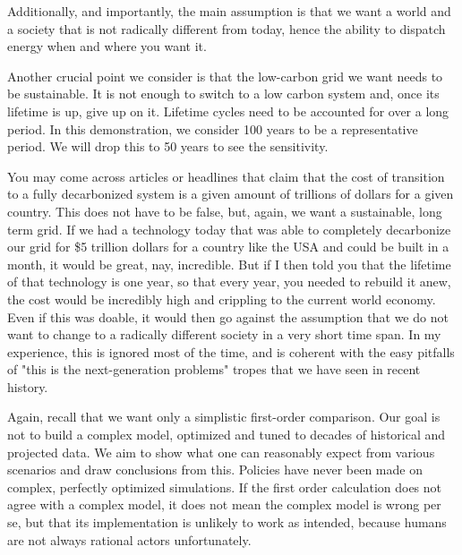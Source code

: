 Additionally, and importantly, the main assumption is that we want a world and a society that is not radically different from today, hence the ability to dispatch energy when and where you want it.

Another crucial point we consider is that the low-carbon grid we want needs to be sustainable. It is not enough to switch to a low carbon system and, once its lifetime is up, give up on it. Lifetime cycles need to be accounted for over a long period. In this demonstration, we consider 100 years to be a representative period. We will drop this to 50 years to see the sensitivity.

\begin{kaobox}[frametitle=The total transition cost is X Trillions\ldots]
You may come across articles or headlines that claim that the cost of transition to a fully decarbonized system is a given amount of trillions of dollars for a given country. This does not have to be false, but, again, we want a sustainable, long term grid. If we had a technology today that was able to completely decarbonize our grid for \$5 trillion dollars for a country like the USA and could be built in a month, it would be great, nay, incredible. But if I then told you that the lifetime of that technology is one year, so that every year, you needed to rebuild it anew, the cost would be incredibly high and crippling to the current world economy. Even if this was doable, it would then go against the assumption that we do not want to change to a radically different society in a very short time span. In my experience, this is ignored most of the time, and is coherent with the easy pitfalls of "this is the next-generation problems" tropes that we have seen in recent history.
\end{kaobox}



Again, recall that we want only a simplistic first-order comparison. Our goal is not to build a complex model, optimized and tuned to decades of historical and projected data. We aim to show what one can reasonably expect from various scenarios and draw conclusions from this. Policies have never been made on complex, perfectly optimized simulations. If the first order calculation does not agree with a complex model, it does not mean the complex model is wrong per se, but that its implementation is unlikely to work as intended, because humans are not always rational actors unfortunately.

